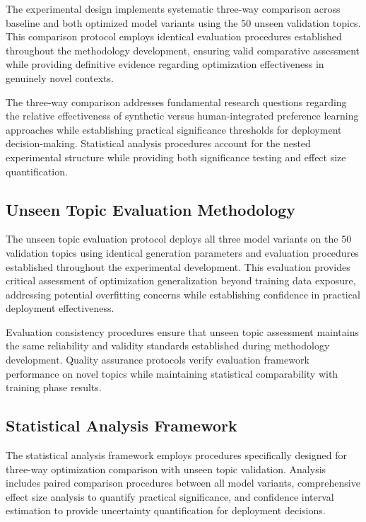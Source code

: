 The experimental design implements systematic three-way comparison across baseline and both optimized model variants using the 50 unseen validation topics. This comparison protocol employs identical evaluation procedures established throughout the methodology development, ensuring valid comparative assessment while providing definitive evidence regarding optimization effectiveness in genuinely novel contexts.

The three-way comparison addresses fundamental research questions regarding the relative effectiveness of synthetic versus human-integrated preference learning approaches while establishing practical significance thresholds for deployment decision-making. Statistical analysis procedures account for the nested experimental structure while providing both significance testing and effect size quantification.

\subsection{Unseen Topic Evaluation Methodology}

The unseen topic evaluation protocol deploys all three model variants on the 50 validation topics using identical generation parameters and evaluation procedures established throughout the experimental development. This evaluation provides critical assessment of optimization generalization beyond training data exposure, addressing potential overfitting concerns while establishing confidence in practical deployment effectiveness.

Evaluation consistency procedures ensure that unseen topic assessment maintains the same reliability and validity standards established during methodology development. Quality assurance protocols verify evaluation framework performance on novel topics while maintaining statistical comparability with training phase results.

\subsection{Statistical Analysis Framework}

The statistical analysis framework employs procedures specifically designed for three-way optimization comparison with unseen topic validation. Analysis includes paired comparison procedures between all model variants, comprehensive effect size analysis to quantify practical significance, and confidence interval estimation to provide uncertainty quantification for deployment decisions.

